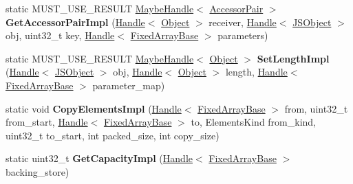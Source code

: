 \begin{DoxyCompactItemize}
\item 
\hypertarget{classv8_1_1internal_1_1_sloppy_arguments_elements_accessor_ae3bb03aa2c1a34f3e04c76628d3a0589}{}static M\+U\+S\+T\+\_\+\+U\+S\+E\+\_\+\+R\+E\+S\+U\+L\+T \hyperlink{classv8_1_1internal_1_1_maybe_handle}{Maybe\+Handle}$<$ \hyperlink{classv8_1_1internal_1_1_accessor_pair}{Accessor\+Pair} $>$ {\bfseries Get\+Accessor\+Pair\+Impl} (\hyperlink{classv8_1_1internal_1_1_handle}{Handle}$<$ \hyperlink{classv8_1_1internal_1_1_object}{Object} $>$ receiver, \hyperlink{classv8_1_1internal_1_1_handle}{Handle}$<$ \hyperlink{classv8_1_1internal_1_1_j_s_object}{J\+S\+Object} $>$ obj, uint32\+\_\+t key, \hyperlink{classv8_1_1internal_1_1_handle}{Handle}$<$ \hyperlink{classv8_1_1internal_1_1_fixed_array_base}{Fixed\+Array\+Base} $>$ parameters)\label{classv8_1_1internal_1_1_sloppy_arguments_elements_accessor_ae3bb03aa2c1a34f3e04c76628d3a0589}

\item 
\hypertarget{classv8_1_1internal_1_1_sloppy_arguments_elements_accessor_a5ace5941867972e512e2a83daadca324}{}static M\+U\+S\+T\+\_\+\+U\+S\+E\+\_\+\+R\+E\+S\+U\+L\+T \hyperlink{classv8_1_1internal_1_1_maybe_handle}{Maybe\+Handle}$<$ \hyperlink{classv8_1_1internal_1_1_object}{Object} $>$ {\bfseries Set\+Length\+Impl} (\hyperlink{classv8_1_1internal_1_1_handle}{Handle}$<$ \hyperlink{classv8_1_1internal_1_1_j_s_object}{J\+S\+Object} $>$ obj, \hyperlink{classv8_1_1internal_1_1_handle}{Handle}$<$ \hyperlink{classv8_1_1internal_1_1_object}{Object} $>$ length, \hyperlink{classv8_1_1internal_1_1_handle}{Handle}$<$ \hyperlink{classv8_1_1internal_1_1_fixed_array_base}{Fixed\+Array\+Base} $>$ parameter\+\_\+map)\label{classv8_1_1internal_1_1_sloppy_arguments_elements_accessor_a5ace5941867972e512e2a83daadca324}

\item 
\hypertarget{classv8_1_1internal_1_1_sloppy_arguments_elements_accessor_a436b035b28f98d9c6b2b52428f3b2af1}{}static void {\bfseries Copy\+Elements\+Impl} (\hyperlink{classv8_1_1internal_1_1_handle}{Handle}$<$ \hyperlink{classv8_1_1internal_1_1_fixed_array_base}{Fixed\+Array\+Base} $>$ from, uint32\+\_\+t from\+\_\+start, \hyperlink{classv8_1_1internal_1_1_handle}{Handle}$<$ \hyperlink{classv8_1_1internal_1_1_fixed_array_base}{Fixed\+Array\+Base} $>$ to, Elements\+Kind from\+\_\+kind, uint32\+\_\+t to\+\_\+start, int packed\+\_\+size, int copy\+\_\+size)\label{classv8_1_1internal_1_1_sloppy_arguments_elements_accessor_a436b035b28f98d9c6b2b52428f3b2af1}

\item 
\hypertarget{classv8_1_1internal_1_1_sloppy_arguments_elements_accessor_aaac655103b3692ad09375fc8a25c77df}{}static uint32\+\_\+t {\bfseries Get\+Capacity\+Impl} (\hyperlink{classv8_1_1internal_1_1_handle}{Handle}$<$ \hyperlink{classv8_1_1internal_1_1_fixed_array_base}{Fixed\+Array\+Base} $>$ backing\+\_\+store)\label{classv8_1_1internal_1_1_sloppy_arguments_elements_accessor_aaac655103b3692ad09375fc8a25c77df}


\end{DoxyCompactItemize}

